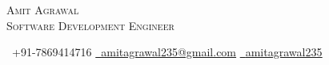 

  
\begin{center}
    { \Huge \scshape Amit Agrawal} \\ 
  
    { \scshape Software Development Engineer} \\ 
 
    \vspace{4pt}
 
    \small \raisebox{-0.1\height}\faPhone\ +91-7869414716 
    \quad\textbar\quad \href{mailto:amitagrawal235@gmail.com}{\raisebox{-0.2\height}\faEnvelope\  \underline{amitagrawal235@gmail.com}} 
    \quad\textbar\quad \href{https://linkedin.com/in/amitagrawal235/}{\raisebox{-0.2\height}\faLinkedin\ \underline{amitagrawal235}}
    \vspace{-12pt}
\end{center}

